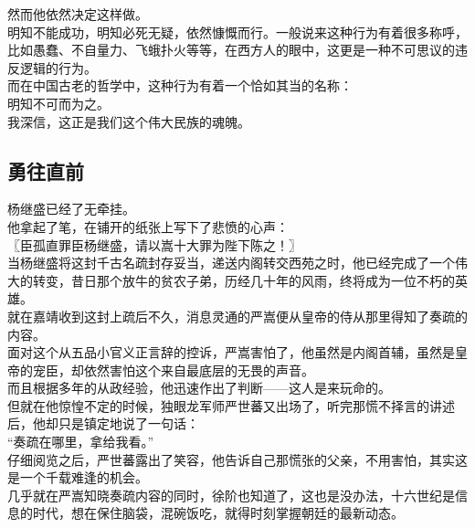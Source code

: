 \begin{multicols}{\theparacolNo}
然而他依然决定这样做。\\

明知不能成功，明知必死无疑，依然慷慨而行。一般说来这种行为有着很多称呼，比如愚蠢、不自量力、飞蛾扑火等等，在西方人的眼中，这更是一种不可思议的违反逻辑的行为。\\

而在中国古老的哲学中，这种行为有着一个恰如其当的名称：\\

明知不可而为之。\\

我深信，这正是我们这个伟大民族的魂魄。\\

\subsection{勇往直前}
杨继盛已经了无牵挂。\\

他拿起了笔，在铺开的纸张上写下了悲愤的心声：\\

〖臣孤直罪臣杨继盛，请以嵩十大罪为陛下陈之！〗\\

当杨继盛将这封千古名疏封存妥当，递送内阁转交西苑之时，他已经完成了一个伟大的转变，昔日那个放牛的贫农子弟，历经几十年的风雨，终将成为一位不朽的英雄。\\

就在嘉靖收到这封上疏后不久，消息灵通的严嵩便从皇帝的侍从那里得知了奏疏的内容。\\

面对这个从五品小官义正言辞的控诉，严嵩害怕了，他虽然是内阁首辅，虽然是皇帝的宠臣，却依然害怕这个来自最底层的无畏的声音。\\

而且根据多年的从政经验，他迅速作出了判断——这人是来玩命的。\\

但就在他惊惶不定的时候，独眼龙军师严世蕃又出场了，听完那慌不择言的讲述后，他却只是镇定地说了一句话：\\

“奏疏在哪里，拿给我看。”\\

仔细阅览之后，严世蕃露出了笑容，他告诉自己那慌张的父亲，不用害怕，其实这是一个千载难逢的机会。\\

几乎就在严嵩知晓奏疏内容的同时，徐阶也知道了，这也是没办法，十六世纪是信息的时代，想在保住脑袋，混碗饭吃，就得时刻掌握朝廷的最新动态。\\


\end{multicols}
